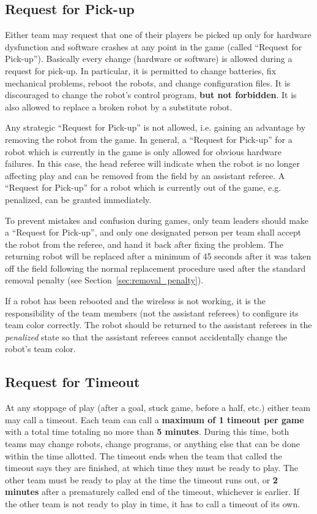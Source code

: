 \documentclass[12pt]{article}
\begin{document}
\subsection{Request for Pick-up}
\label{sec:request_for_pickup}

Either team may request that one of their players be picked up only for hardware dysfunction and software crashes at any point in the game (called ``Request for Pick-up''). 
Basically every change (hardware or software) is allowed during a request for pick-up. In particular,
it is permitted to change batteries, fix mechanical problems, reboot the robots, and change configuration files.
It is discouraged to change the robot's control program, \textbf{but not forbidden}.
It is also allowed to replace a broken robot by a substitute robot.

Any strategic ``Request for Pick-up'' is not allowed, i.e. gaining an advantage by removing the robot from the game.
In general, a ``Request for Pick-up'' for a robot which is currently in the game is only allowed for obvious hardware failures.
In this case, the head referee will indicate when the robot is no longer affecting play and can be removed from the field by an assistant referee.
A ``Request for Pick-up'' for a robot which is currently out of the game, e.g. penalized, can be granted immediately.

To prevent mistakes and confusion during games, only team leaders should make a ``Request for Pick-up'', and only one designated person per team shall accept the robot from the referee, and hand it back after fixing the problem.
The returning robot will be replaced after a minimum of 45 seconds after it was taken off the field following the normal replacement procedure used after the standard removal penalty (see Section~\ref{sec:removal_penalty}).

If a robot has been rebooted and the wireless is not working, it is the responsibility of the team members (not the assistant referees) to configure its team color correctly. The robot should be returned to the assistant referees in the \emph{penalized} state so that the assistant referees cannot accidentally change the robot's team color.

\subsection{Request for Timeout}
\label{sec:request_for_timeout}

At any stoppage of play (after a goal, stuck game, before a half, etc.) either team may call a timeout. Each team can call a \textbf{maximum of 1 timeout per game} with a total time totaling no more than \textbf{5 minutes}. During this time, both teams may change robots, change programs, or anything else that can be done within the time allotted. 
The timeout ends when the team that called the timeout says they are finished, at which time they must be ready to play. The other team must be ready to play at the time the timeout runs out, or \textbf{2 minutes} after a prematurely called end of the timeout, whichever is earlier. If the other team is not ready to play in time, it has to call a timeout of its own.
  
\end{document}
